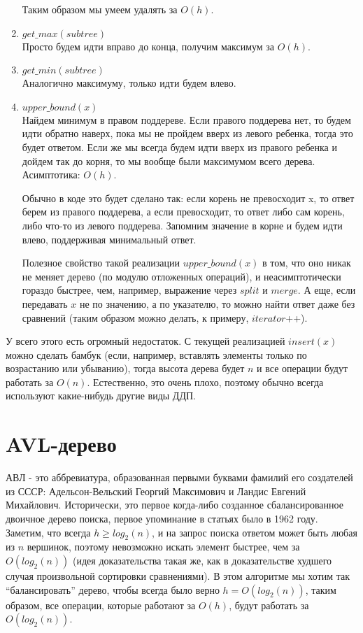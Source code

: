 \begin{enumerate}
    Таким образом мы умеем удалять за $O(h)$.
    \item $get\_max(subtree)$ \\ 
    Просто будем идти вправо до конца, получим максимум за $O(h)$.
    \item $get\_min(subtree)$ \\ 
    Аналогично максимуму, только идти будем влево.
    \item $upper\_bound(x)$ \\
    Найдем минимум в правом поддереве. Если правого поддерева нет, то будем идти обратно наверх, пока мы не пройдем вверх из левого ребенка, тогда это будет ответом. Если же мы всегда будем идти вверх из правого ребенка и дойдем так до корня, то мы вообще были максимумом всего дерева. Асимптотика: $O(h)$.
    \begin{note}
    Обычно в коде это будет сделано так: если корень не превосходит x, то ответ берем из правого поддерева, а если превосходит, то ответ либо сам корень, либо что-то из левого поддерева. Запомним значение в корне и будем идти влево, поддерживая минимальный ответ.
    \end{note}
    Полезное свойство такой реализации $upper\_bound(x)$ в том, что оно никак не меняет дерево (по модулю отложенных операций), и неасимптотически гораздо быстрее, чем, например, выражение через $split$ и $merge$. А еще, если передавать $x$ не по значению, а по указателю, то можно найти ответ даже без сравнений (таким образом можно делать, к примеру, $iterator$++).
\end{enumerate}
У всего этого есть огромный недостаток. С текущей реализацией $insert(x)$ можно сделать бамбук (если, например, вставлять элементы только по возрастанию или убыванию), тогда высота дерева будет $n$ и все операции будут работать за $O(n)$. Естественно, это очень плохо, поэтому обычно всегда используют какие-нибудь другие виды ДДП.



\section{AVL-дерево}



АВЛ - это аббревиатура, образованная первыми буквами фамилий его создателей из СССР: Адельсон-Вельский Георгий Максимович и Ландис Евгений Михайлович. Исторически, это первое когда-либо созданное сбалансированное двоичное дерево поиска, первое упоминание в статьях было в 1962 году. \\
Заметим, что всегда $h \geq log_2(n)$, и на запрос поиска ответом может быть любая из $n$ вершинок, поэтому невозможно искать элемент быстрее, чем за $O(log_2(n))$ (идея доказательства такая же, как в доказательстве худшего случая произвольной сортировки сравнениями). В этом алгоритме мы хотим так ``балансировать'' дерево, чтобы всегда было верно $h = O(log_2(n))$, таким образом, все операции, которые работают за $O(h)$, будут работать за $O(log_2(n))$.

